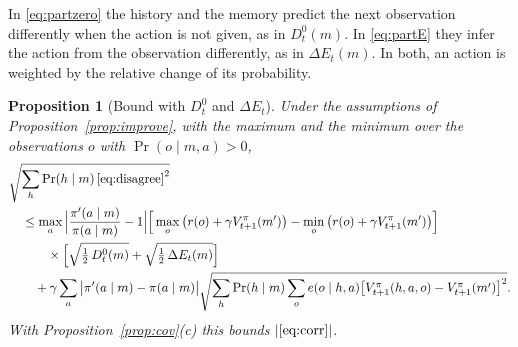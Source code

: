 \documentclass{article}
\newtheorem{proposition}{Proposition}[section]
\theoremstyle{definition}
\numberwithin{equation}{section}
\newcommand{\dE}{\Delta E}
\begin{document}
In \eqref{eq:partzero} the history and the memory predict the next observation differently when the action is not given, as in $D^0_t(m)$. In \eqref{eq:partE} they infer the action from the observation differently, as in $\dE_t(m)$. In both, an action is weighted by the relative change of its probability.

\begin{proposition}[Bound with $D^0_t$ and $\dE_t$]\label{prop:corrbound}
Under the assumptions of Proposition~\ref{prop:improve}, with the maximum and the minimum over the observations $o$ with $\Pr(o\mid m,a)>0$,
\begin{align*}
&\sqrt{\sum_h\Pr(h\mid m)\,\eqref{eq:disagree}^2}\\
&\quad\le\max_a\Big|\frac{\pi'(a\mid m)}{\pi(a\mid m)}-1\Big|\Big[\max_o\big(r(o)+\gamma V^\pi_{t+1}(m')\big)-\min_o\big(r(o)+\gamma V^\pi_{t+1}(m')\big)\Big]\\
&\qquad\quad\times\Big[\sqrt{\tfrac12\,D^0_t(m)}+\sqrt{\tfrac12\,\dE_t(m)}\Big]\\
&\qquad+\gamma\sum_a\big|\pi'(a\mid m)-\pi(a\mid m)\big|\sqrt{\sum_h\Pr(h\mid m)\sum_oe(o\mid h,a)\big[V^\pi_{t+1}(h,a,o)-V^\pi_{t+1}(m')\big]^2}.
\end{align*}
With Proposition~\ref{prop:cov}(c) this bounds $|\eqref{eq:corr}|$.
\end{proposition}
\end{document}
